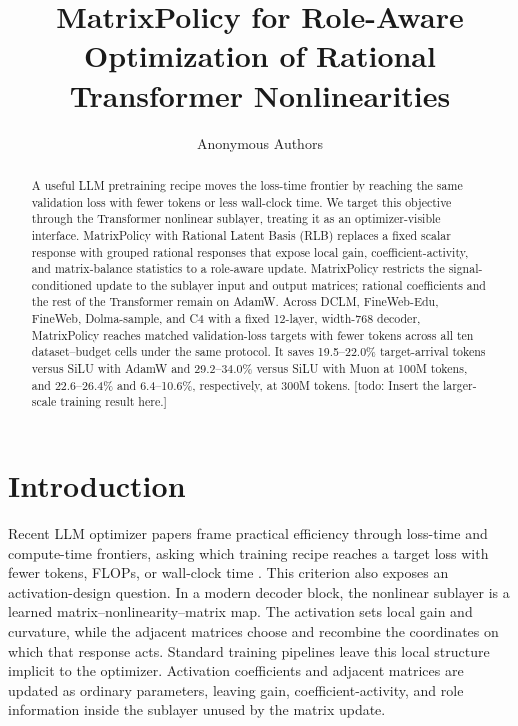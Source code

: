 \documentclass{article}
\title{MatrixPolicy for Role-Aware Optimization of Rational Transformer Nonlinearities}
\author{Anonymous Authors}
\begin{document}
\maketitle

\begin{abstract}
A useful LLM pretraining recipe moves the loss-time frontier by reaching the
same validation loss with fewer tokens or less wall-clock time.  We target this
objective through the Transformer nonlinear sublayer, treating it as an
optimizer-visible interface.  MatrixPolicy with Rational Latent Basis (RLB)
replaces a fixed scalar response with grouped rational responses that expose
local gain, coefficient-activity, and matrix-balance statistics to a role-aware
update.  MatrixPolicy restricts the signal-conditioned update to the sublayer
input and output matrices; rational coefficients and the rest of the Transformer
remain on AdamW.  Across DCLM, FineWeb-Edu, FineWeb, Dolma-sample, and C4 with a
fixed 12-layer, width-768 decoder, MatrixPolicy reaches matched validation-loss
targets with fewer tokens across all ten dataset--budget cells under the same
protocol.  It saves 19.5--22.0\% target-arrival tokens versus
SiLU with AdamW and 29.2--34.0\% versus SiLU with Muon at 100M tokens, and
22.6--26.4\% and 6.4--10.6\%, respectively, at 300M tokens.  [todo: Insert the
larger-scale training result here.]
\end{abstract}

\section{Introduction}
\label{sec:introduction}

Recent LLM optimizer papers frame practical efficiency through loss-time and
compute-time frontiers, asking which training recipe reaches a target loss with
fewer tokens, FLOPs, or wall-clock time
\citep{shah2025practicalefficiency,liu2025muon,semenov2025benchmarking}.  This
criterion also exposes an activation-design question.  In a modern decoder
block, the nonlinear sublayer is a learned matrix--nonlinearity--matrix map.  The
activation sets local gain and curvature, while the adjacent matrices choose and
recombine the coordinates on which that response acts.  Standard training
pipelines leave this local structure implicit to the optimizer.  Activation
coefficients and adjacent matrices are updated as ordinary parameters, leaving
gain, coefficient-activity, and role information inside the sublayer unused by
the matrix update.
\end{document}
